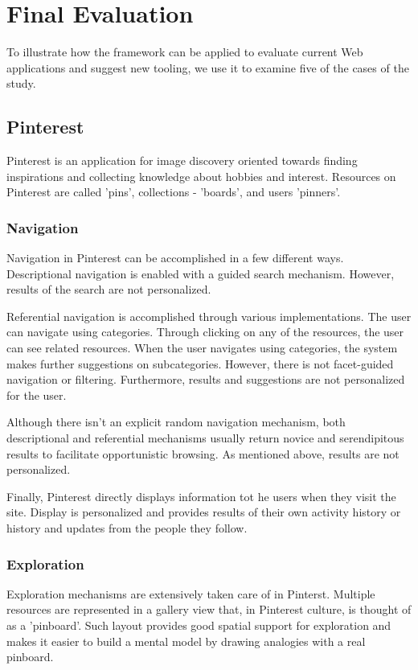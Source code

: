 {\section{Final Evaluation}
To illustrate how the framework can be applied to evaluate current Web applications and suggest new tooling, we use it to examine five of the cases of the study.

{\subsection{Pinterest}
Pinterest is an application for image discovery oriented towards finding inspirations and collecting knowledge about hobbies and interest. Resources on Pinterest are called 'pins', collections - 'boards', and users 'pinners'. 

{\subsubsection{Navigation}
Navigation in Pinterest can be accomplished in a few different ways. Descriptional navigation is enabled with a guided search mechanism. However, results of the search are not personalized. 

Referential navigation is accomplished through various implementations. The user can navigate using categories. Through clicking on any of the resources, the user can see related resources. When the user navigates using categories, the system makes further suggestions on subcategories. However, there is not facet-guided navigation or filtering. Furthermore, results and suggestions are not personalized for the user. 

Although there isn't an explicit random navigation mechanism, both descriptional and referential mechanisms usually return novice and serendipitous results to facilitate opportunistic browsing. As mentioned above, results are not personalized.

Finally, Pinterest directly displays information tot he users when they visit the site. Display is personalized and provides results of their own activity history or history and updates from the people they follow.
}%

 
{\subsubsection{Exploration}Exploration mechanisms are extensively taken care of in Pinterst. Multiple resources are represented in a gallery view that, in Pinterest culture, is thought of as a 'pinboard'. Such layout provides good spatial support for exploration and makes it easier to build a mental model by drawing analogies with a real pinboard. 

}}}
